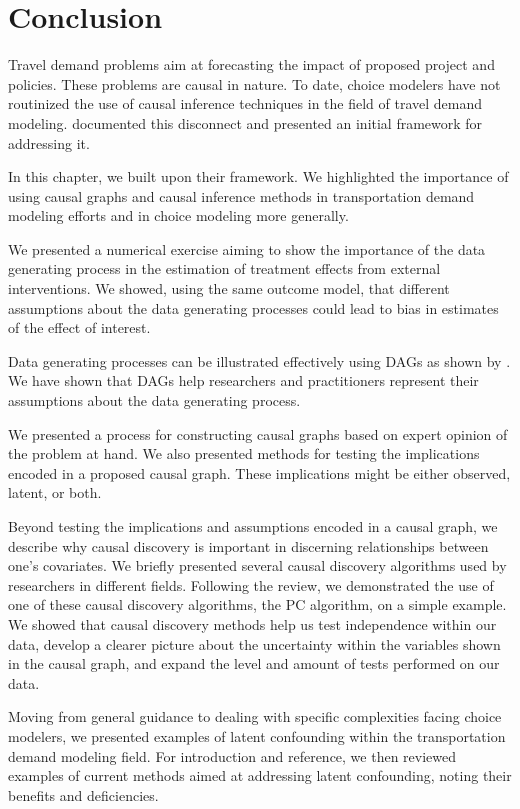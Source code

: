 \section{Conclusion}
\label{sec:conclusion}

Travel demand problems aim at forecasting the impact of proposed project and policies. These problems are causal in nature. 
To date, choice modelers have not routinized the use of causal inference techniques in the field of travel demand modeling.
\citet{brathwaite_2018_causal} documented this disconnect and presented an initial framework for addressing it.

In this chapter, we built upon their framework.
We highlighted the importance of using causal graphs and causal inference methods in transportation demand modeling efforts and in choice modeling more generally.

We presented a numerical exercise aiming to show the importance of the data generating process in the estimation 
of treatment effects from external interventions. 
We showed, using the same outcome model, that different assumptions about the data generating processes could 
lead to bias in estimates of the effect of interest.

Data generating processes can be illustrated effectively using DAGs as shown by \citet{pearl_1995_causal}.
We have shown that DAGs help researchers and practitioners represent their assumptions about the data generating process. 

We presented a process for constructing causal graphs based on expert opinion of the problem at hand. 
We also presented methods for testing the implications encoded in a proposed causal graph. 
These implications might be either observed, latent, or both.

Beyond testing the implications and assumptions encoded in a causal graph, we describe why causal discovery is important in discerning relationships between one's covariates.
We briefly presented several causal discovery algorithms used by
researchers in different fields. 
Following the review, we demonstrated the use of one of these causal discovery algorithms, the PC algorithm, on a simple example. 
We showed that causal discovery methods help us test independence within our data, 
develop a clearer picture about the uncertainty within the variables shown in the causal graph, 
and expand the level and amount of tests performed on our data.

Moving from general guidance to dealing with specific complexities facing choice modelers, we presented examples of latent confounding within the transportation demand modeling field.
For introduction and reference, we then reviewed examples of current methods aimed at addressing latent confounding, noting their benefits and deficiencies.

